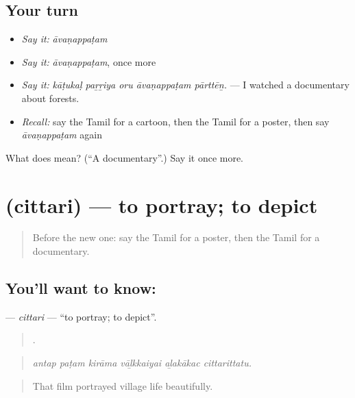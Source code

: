 \subsection*{Your turn}
\begin{itemize}
\raggedright
  \item \emph{Say it:} \emph{āvaṇappaṭam}
  \item \emph{Say it:} \emph{āvaṇappaṭam}, once more
  \item \emph{Say it:} \emph{kāṭukaḷ paṟṟiya oru āvaṇappaṭam pārttēṉ.} — I watched a documentary about forests.
  \item \emph{Recall:} say the Tamil for a cartoon, then the Tamil for a poster, then say \emph{āvaṇappaṭam} again
\end{itemize}

\begin{tcolorbox}[breakable,colback=teal!4,colframe=teal!35!black,title={Before you move on}]
What does  mean? (\textquotedblleft{}A documentary\textquotedblright{}.) Say it once more.
\end{tcolorbox}
\section[\texorpdfstring{\ta{சித்தரி} (cittari)}{சித்தரி (cittari)}]{ (cittari) — to portray; to depict}

\label{lesson:TA-C310-cittari}



\begin{quote}
Before the new one: say the Tamil for a poster, then the Tamil for a documentary.
\end{quote}

\subsection*{You'll want to know: }
\textbf{} — \emph{cittari} — \textquotedblleft{}to portray; to depict\textquotedblright{}.

\begin{quote}
     .
\end{quote}

\begin{quote}
\emph{antap paṭam kirāma vāḻkkaiyai aḻakākac cittarittatu.}
\end{quote}

\begin{quote}
That film portrayed village life beautifully.
\end{quote}

